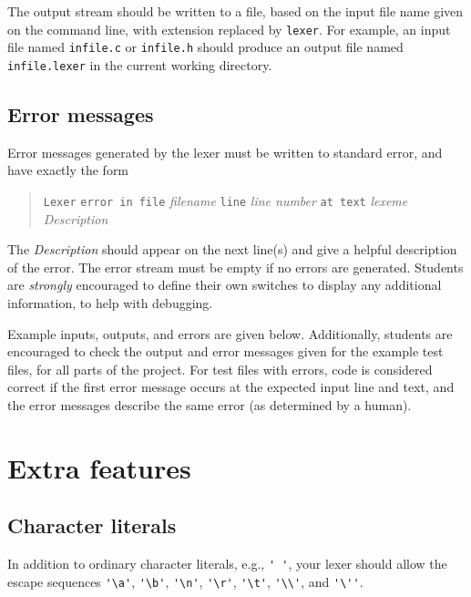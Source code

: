 \documentclass{article}
\begin{document}
The output stream should be written to a file,
based on the input file name given on the command line,
with extension replaced by {\tt lexer}.
For example, an input file named {\tt infile.c} or {\tt infile.h}
should produce an output file named {\tt infile.lexer} in
the current working directory.


\subsection{Error messages}

Error messages generated by the lexer must
be written to standard error,
and have exactly the form
\begin{quote}
	\begin{tabbing}
		{\tt Lexer} \= {\tt error in file} \emph{filename}
		{\tt line} \emph{line number}
		{\tt at text} \emph{lexeme}
	\\
		\> \emph{Description}
	\end{tabbing}
\end{quote}
The \emph{Description} should appear on the next line(s)
and give a helpful description of the error.
The error stream must be empty if no errors are generated.
Students are \emph{strongly} encouraged to define their own switches
	to display any additional information, to help with debugging.


Example inputs, outputs, and errors are given below.
Additionally, students are encouraged to check the output and error messages
given for the example test files, for all parts of the project.
For test files with errors,
code is considered correct if the first error message
occurs at the expected input line and text,
and the error messages describe the same error
(as determined by a human).

\section{Extra features}

\subsection{Character literals}
\label{SEC:chars}

In addition to ordinary character literals,
e.g., \verb|' '|,
your lexer should allow
the escape sequences
\verb|'\a'|, \verb|'\b'|, \verb|'\n'|, \verb|'\r'|, \verb|'\t'|, \verb|'\\'|,
and \verb|'\''|.
\end{document}
